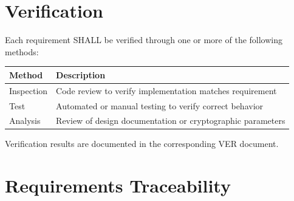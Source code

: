 \documentclass[11pt,letterpaper]{article}
\begin{document}
\section{Verification}

Each requirement SHALL be verified through one or more of the following methods:

\begin{tabularx}{\textwidth}{lX}
\toprule
\textbf{Method} & \textbf{Description} \\
\midrule
Inspection & Code review to verify implementation matches requirement \\
Test & Automated or manual testing to verify correct behavior \\
Analysis & Review of design documentation or cryptographic parameters \\
\bottomrule
\end{tabularx}

\vspace{12pt}

Verification results are documented in the corresponding VER document.

\section{Requirements Traceability}
\end{document}
